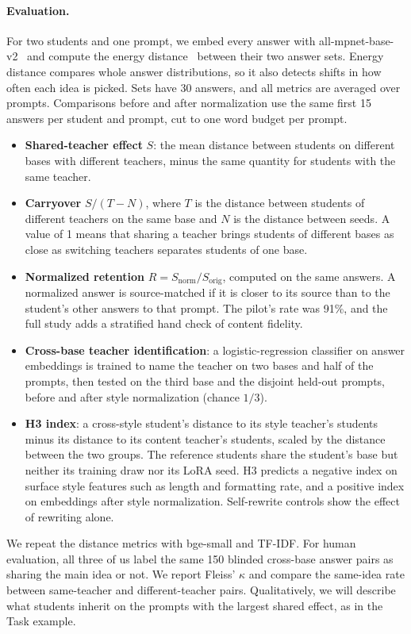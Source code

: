 \documentclass{article}
\begin{document}
\paragraph{Evaluation.}
For two students and one prompt, we embed every answer with all-mpnet-base-v2~\cite{reimers2019sbert} and compute the energy distance~\cite{szekely2013energy} between their two answer sets. Energy distance compares whole answer distributions, so it also detects shifts in how often each idea is picked. Sets have 30 answers, and all metrics are averaged over prompts. Comparisons before and after normalization use the same first 15 answers per student and prompt, cut to one word budget per prompt.
\begin{itemize}
    \item \textbf{Shared-teacher effect} $S$: the mean distance between students on different bases with different teachers, minus the same quantity for students with the same teacher.
    \item \textbf{Carryover} $S/(T-N)$, where $T$ is the distance between students of different teachers on the same base and $N$ is the distance between seeds. A value of 1 means that sharing a teacher brings students of different bases as close as switching teachers separates students of one base.
    \item \textbf{Normalized retention} $R=S_{\mathrm{norm}}/S_{\mathrm{orig}}$, computed on the same answers. A normalized answer is source-matched if it is closer to its source than to the student's other answers to that prompt. The pilot's rate was 91\%, and the full study adds a stratified hand check of content fidelity.
    \item \textbf{Cross-base teacher identification}: a logistic-regression classifier on answer embeddings is trained to name the teacher on two bases and half of the prompts, then tested on the third base and the disjoint held-out prompts, before and after style normalization (chance $1/3$).
    \item \textbf{H3 index}: a cross-style student's distance to its style teacher's students minus its distance to its content teacher's students, scaled by the distance between the two groups. The reference students share the student's base but neither its training draw nor its LoRA seed. H3 predicts a negative index on surface style features such as length and formatting rate, and a positive index on embeddings after style normalization. Self-rewrite controls show the effect of rewriting alone.
\end{itemize}
We repeat the distance metrics with bge-small and TF-IDF. For human evaluation, all three of us label the same 150 blinded cross-base answer pairs as sharing the main idea or not. We report Fleiss' $\kappa$ and compare the same-idea rate between same-teacher and different-teacher pairs. Qualitatively, we will describe what students inherit on the prompts with the largest shared effect, as in the Task example.
\end{document}
